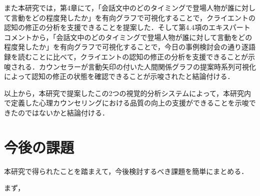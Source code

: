 \documentclass[shuuron]{kuee}
\begin{document}





また本研究では，第4章にて，「会話文中のどのタイミングで登場人物が誰に対して言動をどの程度発したか」を有向グラフで可視化することで，クライエントの認知の修正の分析を支援できることを提案した．そして第4.4項のエキスパートコメントから，「会話文中のどのタイミングで登場人物が誰に対して言動をどの程度発したか」を有向グラフで可視化することで，今日の事例検討会の通り逐語録を読むことに比べて，クライエントの認知の修正の分析を支援できることが示唆される．カウンセラーが言動矢印の付いた人間関係グラフの提案時系列可視化によって認知の修正の状態を確認できることが示唆されたと結論付ける．

以上から，本研究で提案したこの2つの視覚的分析システムによって，本研究内で定義した心理カウンセリングにおける品質の向上の支援ができることを示唆できたのではないかと結論付ける．%


\section{今後の課題}

本研究で得られたことを踏まえて，今後検討するべき課題を簡単にまとめる．

まず，
\end{document}
